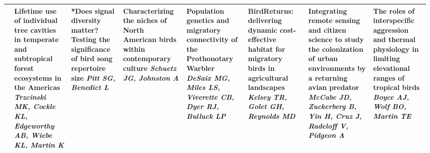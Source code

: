 \begin{tabular}{|x{0.85cm}|x{2.85cm}|x{2.85cm}|x{2.85cm}|x{2.85cm}|a{2.85cm}|a{2.85cm}|a{2.85cm}|}
&Lifetime use of individual tree cavities in temperate and subtropical forest ecosystems in the Americas \newline \newline \textit{Trzcinski MK, Cockle KL, Edgeworthy AB, Wiebe KL, Martin K} & *Does signal diversity matter? Testing the significance of bird song repertoire size \newline \newline \textit{Pitt SG, Benedict L} & Characterizing the niches of North American birds within contemporary culture \newline \newline \textit{Schuetz JG, Johnston A} & Population genetics and migratory connectivity of the Prothonotary Warbler \newline \newline \textit{DeSaix MG, Miles LS, Viverette CB, Dyer RJ, Bulluck LP} & BirdReturns: delivering dynamic cost-effective habitat for migratory birds in agricultural landscapes \newline \newline \textit{Kelsey TR, Golet GH, Reynolds MD} & Integrating remote sensing and citizen science to study the colonization of urban environments by a returning avian predator \newline \newline \textit{McCabe JD, Zuckerberg B, Yin H, Cruz J, Radeloff V, Pidgeon A} & The roles of interspecific aggression and thermal physiology in limiting elevational ranges of tropical birds \newline \newline \textit{Boyce AJ, Wolf BO, Martin TE}\\
\hline

\end{tabular}

